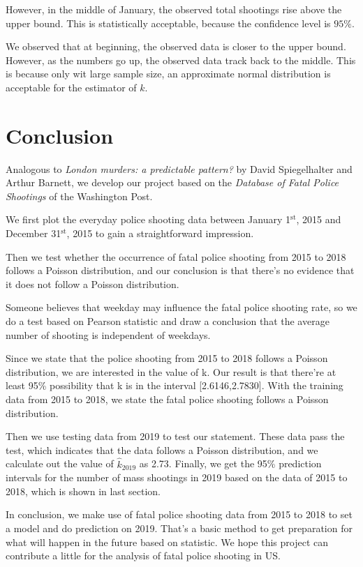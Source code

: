 \documentclass[a4paper]{article}
\begin{document}
However, in the middle of January, the observed total shootings rise above the upper bound. This is statistically acceptable, because the confidence level is $95\%$.

We observed that at beginning, the observed data is closer to the upper bound. However, as the numbers go up, the observed data track back to the middle. This is because only wit large sample size, an approximate normal distribution is acceptable for the estimator of $k$.

\newpage

\section{Conclusion}
Analogous to \textit{London murders: a predictable pattern?} by David Spiegelhalter and Arthur Barnett, we develop our project based on the \textit{Database of Fatal Police Shootings} of the Washington Post. 

We first plot the everyday police shooting data between January 1$^{\text{st}}$, 2015 and December 31$^{\text{st}}$, 2015 to gain a straightforward impression. 

Then we test whether the occurrence of fatal police shooting from 2015 to 2018 follows a Poisson distribution, and our conclusion is that there's no evidence that it does not follow a Poisson distribution. 

Someone believes that weekday may influence the fatal police shooting rate, so we do a test based on Pearson statistic and draw a conclusion that the average number of shooting is independent of weekdays. 

Since we state that the police shooting from 2015 to 2018 follows a Poisson distribution, we are interested in the value of k. Our result is that there're at least 95\% possibility that k is in the interval [2.6146,2.7830]. With the training data from 2015 to 2018, we state the fatal police shooting follows a Poisson distribution. 

Then we use testing data from 2019 to test our statement. These data pass the test, which indicates that the data follows a Poisson distribution, and we calculate out the value of $\widehat { k } _ { 2019 }$ as 2.73. Finally, we get the 95\% prediction intervals for the number of mass shootings in 2019 based on the data of 2015 to 2018, which is shown in last section. 

In conclusion, we make use of fatal police shooting data from 2015 to 2018 to set a model and do prediction on 2019. That's a basic method to get preparation for what will happen in the future based on statistic. We hope this project can contribute a little for the analysis of fatal police shooting in US.
\end{document}
